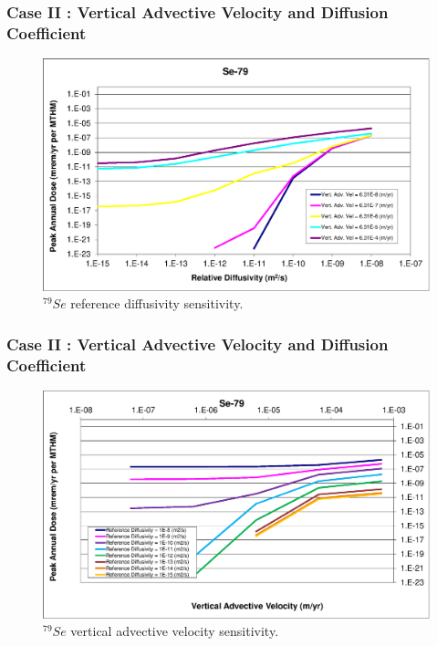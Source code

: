 \begin{frame}[c]
  \frametitle{Case II : Vertical Advective Velocity and Diffusion Coefficient}
\begin{figure}[htp!]
\centering
\includegraphics[width=\linewidth]{AdvVelAndDiffCoeffEBSFail/Se-79.eps}
\caption{$^{79}Se$ reference diffusivity sensitivity.}
\label{fig:VAdvVelSe79}
\end{figure}
\end{frame}

\begin{frame}[c]
  \frametitle{Case II : Vertical Advective Velocity and Diffusion Coefficient}
\begin{figure}[ht!]
\centering
\includegraphics[width=\linewidth]{AdvVelAndDiffCoeffEBSFail/Se-79-VAdvVel.eps}
\caption{$^{79}Se$ vertical advective velocity sensitivity.}
\label{fig:VAdvVelSe79VAdvVel}
\end{figure}
\end{frame}

